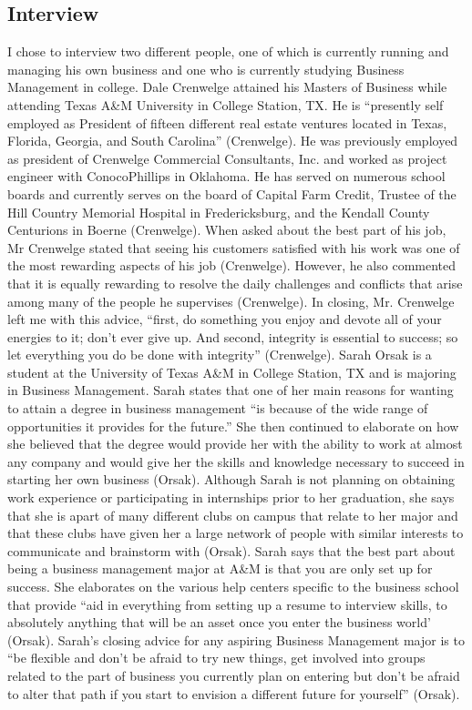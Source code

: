 \begin{multicols}{2}
\section{Interview}
I chose to interview two different people, one of which is currently running and managing his own business and one who is currently studying Business Management in college.
    Dale Crenwelge attained his Masters of Business while attending Texas A\&M University in College Station, TX. He is “presently self employed as President of fifteen different real estate ventures located in Texas, Florida, Georgia, and South Carolina” (Crenwelge).  He was previously employed as president of Crenwelge Commercial Consultants, Inc. and worked as project engineer with ConocoPhillips in Oklahoma. He has served on numerous school boards and currently serves on the board of Capital Farm Credit, Trustee of the Hill Country Memorial Hospital in Fredericksburg, and the Kendall County Centurions in Boerne (Crenwelge). When asked about the best part of his job, Mr Crenwelge stated that seeing his customers satisfied with his work was one of the most rewarding aspects of his job (Crenwelge). However, he also commented that it is equally rewarding to resolve the daily challenges and conflicts that arise among many of the people he supervises (Crenwelge). In closing, Mr. Crenwelge left me with this advice, “first, do something you enjoy and devote all of your energies to it; don’t ever give up. And second, integrity is essential to success; so let everything you do be done with integrity” (Crenwelge).
    Sarah Orsak is a student at the University of Texas A\&M in College Station, TX and is majoring in Business Management. Sarah states that one of her main reasons for wanting to attain a degree in business management “is because of the wide range of opportunities it provides for the future.” She then continued to elaborate on how she believed that the degree would provide her with the ability to work at almost any company and would give her the skills and knowledge necessary to succeed in starting her own business (Orsak). Although Sarah is not planning on obtaining work experience or participating in internships prior to her graduation, she says that she is apart of many different clubs on campus that relate to her major and that these clubs have given her a large network of people with similar interests to communicate and brainstorm with (Orsak). Sarah says that the best part about being a business management major at A\&M is that you are only set up for success. She elaborates on the various help centers specific to the business school that provide “aid in everything from setting up a resume to interview skills, to absolutely anything that will be an asset once you enter the business world’ (Orsak). Sarah’s closing advice for any aspiring Business Management major is to “be flexible and don’t be afraid to try new things, get involved into groups related to the part of business you currently plan on entering but don’t be afraid to alter that path if you start to envision a different future for yourself” (Orsak).

\end{multicols}
